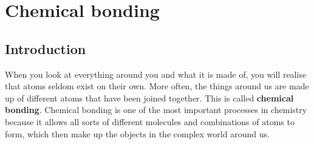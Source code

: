          \chapter{Chemical bonding}
    \setcounter{figure}{1}
    \setcounter{subfigure}{1}
    \label{m38704*cid1}
            \section{Introduction}
            \nopagebreak
      \label{m38704*id138190}When you look at everything around you and what it is made of, you will realise that atoms seldom exist on their own. More often, the things around us are made up of different atoms that have been joined together. This is called \textbf{chemical bonding}. Chemical bonding is one of the most important processes in chemistry because it allows all sorts of different molecules and combinations of atoms to form, which then make up the objects in the complex world around us.\par 
    \label{m38704*cid4}
